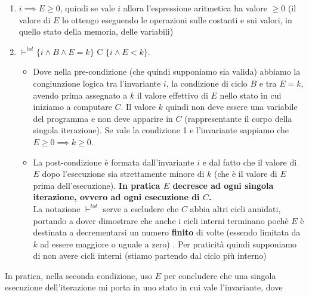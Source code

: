 				      				\begin{enumerate}
				      					\item $i\implies E\geq 0$, quindi se vale $i$ allora l'espressione aritmetica
				      					      ha valore $\geq 0$ (il valore di $E$ lo ottengo eseguendo le operazioni sulle
				      					      costanti e sui valori, in quello stato della memoria, delle variabili)
				      					      \label{ConditionTotalCorrectness1}
				      					\item $\vdash^{tot}\{i\land B\land E=k\}\mbox{ C }\{i\land E<k\}$.
				      					\begin{itemize}
				      					    \item Dove
				      					      nella pre-condizione (che quindi supponiamo sia valida) abbiamo la congiunzione logica tra l'invariante $i$, la
				      					      condizione di ciclo $B$ e tra $E=k$, avendo prima assegnato a $k$ il valore
				      					      effettivo di $E$ nello stato in cui iniziamo a computare $C$. Il valore $k$ quindi non
				      					      deve essere una variabile del programma e non deve apparire in $C$
				      					      (rappresentante il corpo della singola iterazione). Se vale la
				      					      condizione 1 e l'invariante sappiamo che $E\geq 0\implies k\geq 0$. 
				      					      \item La
				      					      post-condizione è formata dall'invariante $i$ e dal fatto che il valore di $E$
				      					      dopo l'esecuzione sia strettamente minore di $k$ (che è il valore di $E$ prima
				      					      dell'esecuzione). \textbf{In pratica $E$ decresce ad ogni singola iterazione, ovvero
				      					      	ad ogni esecuzione di $C$.}\\
				      					      La notazione $\vdash^{tot}$ serve a escludere che $C$ abbia altri cicli
				      					      annidati, portando a dover dimostrare che anche i cicli interni
				      					      terminano pochè $E$ è destinata a decrementarsi un numero \textbf{finito} di volte (essendo limitata da $k$ ad essere maggiore o uguale a zero) . Per praticità quindi supponiamo di non avere cicli interni (stiamo
				      					      partendo dal ciclo più interno)
				      					\end{itemize}
				      		
				      					      \label{ConditionTotalCorrectness2}
				      				\end{enumerate}
				      				In pratica, nella seconda condizione, uso $E$ per concludere che una singola
				      				esecuzione dell'iterazione mi porta in uno stato in cui vale l'invariante, dove

